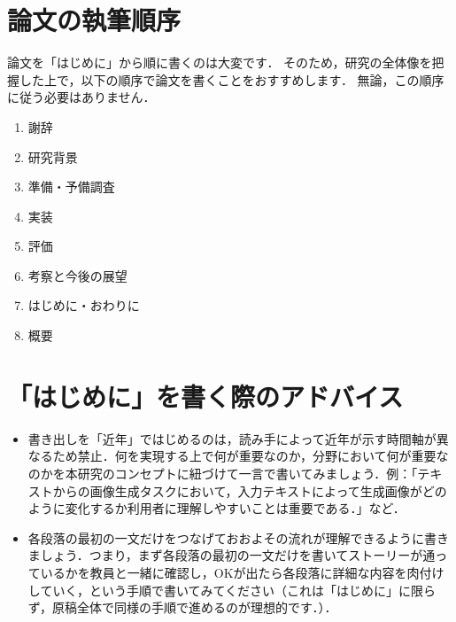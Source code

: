 \section{論文の執筆順序}
論文を「はじめに」から順に書くのは大変です．
そのため，研究の全体像を把握した上で，以下の順序で論文を書くことをおすすめします．
無論，この順序に従う必要はありません．

\begin{enumerate}
    \item 謝辞
    \item 研究背景
    \item 準備・予備調査
    \item 実装
    \item 評価
    \item 考察と今後の展望
    \item はじめに・おわりに
    \item 概要
\end{enumerate}

\section{「はじめに」を書く際のアドバイス}
\begin{itemize}
    \item 書き出しを「近年」ではじめるのは，読み手によって近年が示す時間軸が異なるため禁止．何を実現する上で何が重要なのか，分野において何が重要なのかを本研究のコンセプトに紐づけて一言で書いてみましょう．例：「テキストからの画像生成タスクにおいて，入力テキストによって生成画像がどのように変化するか利用者に理解しやすいことは重要である．」など．
    \item 各段落の最初の一文だけをつなげておおよその流れが理解できるように書きましょう．つまり，まず各段落の最初の一文だけを書いてストーリーが通っているかを教員と一緒に確認し，OKが出たら各段落に詳細な内容を肉付けしていく，という手順で書いてみてください（これは「はじめに」に限らず，原稿全体で同様の手順で進めるのが理想的です．）．
\end{itemize}
